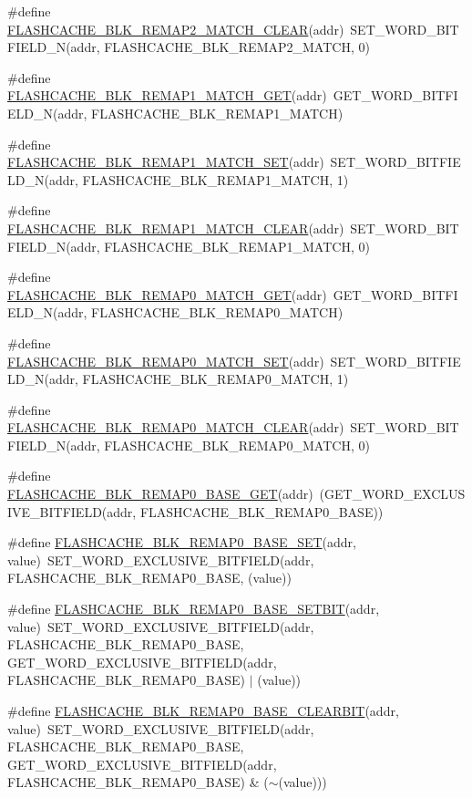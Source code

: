 \begin{DoxyCompactItemize}
\#define \hyperlink{a00549_a8cc76fdcde4a61deb6df09e1e3d6c228}{FLASHCACHE\_\-BLK\_\-REMAP2\_\-MATCH\_\-CLEAR}(addr)~SET\_\-WORD\_\-BITFIELD\_\-N(addr, FLASHCACHE\_\-BLK\_\-REMAP2\_\-MATCH, 0)
\item 
\#define \hyperlink{a00549_ac51e71befd326fdc10b51a32c466c58d}{FLASHCACHE\_\-BLK\_\-REMAP1\_\-MATCH\_\-GET}(addr)~GET\_\-WORD\_\-BITFIELD\_\-N(addr, FLASHCACHE\_\-BLK\_\-REMAP1\_\-MATCH)
\item 
\#define \hyperlink{a00549_aac66917117314c1d00f614106ddb60ec}{FLASHCACHE\_\-BLK\_\-REMAP1\_\-MATCH\_\-SET}(addr)~SET\_\-WORD\_\-BITFIELD\_\-N(addr, FLASHCACHE\_\-BLK\_\-REMAP1\_\-MATCH, 1)
\item 
\#define \hyperlink{a00549_a0be757f32cb1a4e759cd41bae1b3f32a}{FLASHCACHE\_\-BLK\_\-REMAP1\_\-MATCH\_\-CLEAR}(addr)~SET\_\-WORD\_\-BITFIELD\_\-N(addr, FLASHCACHE\_\-BLK\_\-REMAP1\_\-MATCH, 0)
\item 
\#define \hyperlink{a00549_a8baa5c2f0f735f1163bbe69c09b8ee0b}{FLASHCACHE\_\-BLK\_\-REMAP0\_\-MATCH\_\-GET}(addr)~GET\_\-WORD\_\-BITFIELD\_\-N(addr, FLASHCACHE\_\-BLK\_\-REMAP0\_\-MATCH)
\item 
\#define \hyperlink{a00549_a0b5fc1841b5f3415dd513dc99c84ff5f}{FLASHCACHE\_\-BLK\_\-REMAP0\_\-MATCH\_\-SET}(addr)~SET\_\-WORD\_\-BITFIELD\_\-N(addr, FLASHCACHE\_\-BLK\_\-REMAP0\_\-MATCH, 1)
\item 
\#define \hyperlink{a00549_a657e8202a1d974438c5b7ec929f088af}{FLASHCACHE\_\-BLK\_\-REMAP0\_\-MATCH\_\-CLEAR}(addr)~SET\_\-WORD\_\-BITFIELD\_\-N(addr, FLASHCACHE\_\-BLK\_\-REMAP0\_\-MATCH, 0)
\item 
\#define \hyperlink{a00549_acb5bc68640239710f089e4e9ed49199f}{FLASHCACHE\_\-BLK\_\-REMAP0\_\-BASE\_\-GET}(addr)~(GET\_\-WORD\_\-EXCLUSIVE\_\-BITFIELD(addr, FLASHCACHE\_\-BLK\_\-REMAP0\_\-BASE))
\item 
\#define \hyperlink{a00549_aa4ad1cd70cf87704bde3eab3b6215dfb}{FLASHCACHE\_\-BLK\_\-REMAP0\_\-BASE\_\-SET}(addr, value)~SET\_\-WORD\_\-EXCLUSIVE\_\-BITFIELD(addr, FLASHCACHE\_\-BLK\_\-REMAP0\_\-BASE, (value))
\item 
\#define \hyperlink{a00549_ab673ba8958b58720fbbf88427ea43f7e}{FLASHCACHE\_\-BLK\_\-REMAP0\_\-BASE\_\-SETBIT}(addr, value)~SET\_\-WORD\_\-EXCLUSIVE\_\-BITFIELD(addr, FLASHCACHE\_\-BLK\_\-REMAP0\_\-BASE, GET\_\-WORD\_\-EXCLUSIVE\_\-BITFIELD(addr, FLASHCACHE\_\-BLK\_\-REMAP0\_\-BASE) $|$ (value))
\item 
\#define \hyperlink{a00549_a8a3adc7db656ba4f59a0d9159059ea0d}{FLASHCACHE\_\-BLK\_\-REMAP0\_\-BASE\_\-CLEARBIT}(addr, value)~SET\_\-WORD\_\-EXCLUSIVE\_\-BITFIELD(addr, FLASHCACHE\_\-BLK\_\-REMAP0\_\-BASE, GET\_\-WORD\_\-EXCLUSIVE\_\-BITFIELD(addr, FLASHCACHE\_\-BLK\_\-REMAP0\_\-BASE) \& ($\sim$(value)))

\end{DoxyCompactItemize}
